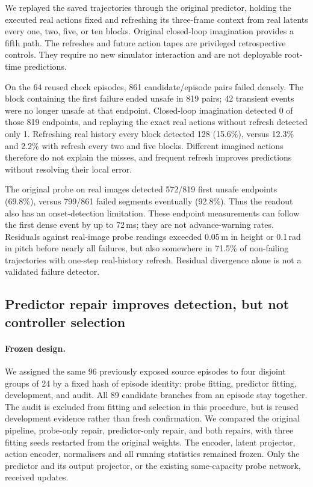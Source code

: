 \documentclass[sigconf,dvipsnames]{acmart}
\begin{document}
We replayed the saved trajectories through the original predictor, holding the
executed real actions fixed and refreshing its three-frame context from real
latents every one, two, five, or ten blocks. Original closed-loop imagination
provides a fifth path. The refreshes and future action tapes are privileged
retrospective controls. They require no new simulator interaction and are not
deployable root-time predictions.

On the 64 reused check episodes, 861 candidate/episode pairs failed densely.
The block containing the first failure ended unsafe in 819 pairs; 42 transient
events were no longer unsafe at that endpoint. Closed-loop imagination detected
0 of those 819 endpoints, and replaying the exact real actions without refresh
detected only 1. Refreshing real history every block detected 128 (15.6\%),
versus 12.3\% and 2.2\% with refresh every two and five blocks. Different
imagined actions therefore do not explain the misses, and frequent refresh
improves predictions without resolving their local error.

The original probe on real images detected 572/819 first unsafe endpoints
(69.8\%), versus 799/861 failed segments eventually (92.8\%). Thus the readout
also has an onset-detection limitation. These endpoint measurements can follow
the first dense event by up to 72\,ms; they are not advance-warning rates.
Residuals against real-image probe readings exceeded 0.05\,m in height or
0.1\,rad in pitch before nearly all failures, but also somewhere in 71.5\%
of non-failing trajectories with one-step real-history refresh. Residual divergence alone is not a validated failure detector.

\subsection{Predictor repair improves detection, but not controller selection}
\label{sec:repair}

\paragraph{Frozen design.}
We assigned the same 96 previously exposed source episodes to four disjoint
groups of 24 by a fixed hash of episode identity: probe fitting, predictor
fitting, development, and audit. All 89 candidate branches from an episode
stay together. The audit is excluded from fitting and selection in this
procedure, but is reused development evidence rather than fresh confirmation.
We compared the original pipeline, probe-only repair, predictor-only repair,
and both repairs, with three fitting seeds restarted from the original weights.
The encoder, latent projector, action encoder, normalisers and all running
statistics remained frozen. Only the predictor and its output projector, or
the existing same-capacity probe network, received updates.
\end{document}
